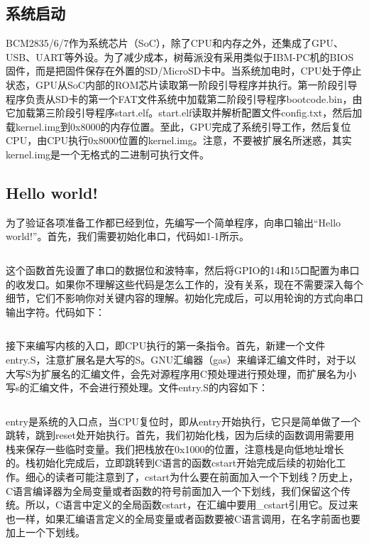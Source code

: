 \documentclass[main.tex]{subfiles}
\begin{document}
\begin{CJK*}{UTF8}{song}

\chapter{系统启动}
BCM2835/6/7作为系统芯片（SoC），除了CPU和内存之外，还集成了GPU、USB、UART等外设。为了减少成本，树莓派没有采用类似于IBM-PC机的BIOS固件，而是把固件保存在外置的SD/MicroSD卡中。当系统加电时，CPU处于停止状态，GPU从SoC内部的ROM芯片读取第一阶段引导程序并执行。第一阶段引导程序负责从SD卡的第一个FAT文件系统中加载第二阶段引导程序bootcode.bin，由它加载第三阶段引导程序start.elf。start.elf读取并解析配置文件config.txt，然后加载kernel.img到0x8000的内存位置。至此，GPU完成了系统引导工作，然后复位CPU，由CPU执行0x8000位置的kernel.img。注意，不要被扩展名所迷惑，其实kernel.img是一个无格式的二进制可执行文件。

\section{Hello world!}
为了验证各项准备工作都已经到位，先编写一个简单程序，向串口输出“Hello world!”。首先，我们需要初始化串口，代码如1-1所示。

\inputminted[firstline=6,lastline=30,linenos,numbersep=5pt,frame=lines,framesep=2mm]{c}{chapter02/kernel/machdep.c}

这个函数首先设置了串口的数据位和波特率，然后将GPIO的14和15口配置为串口的收发口。如果你不理解这些代码是怎么工作的，没有关系，现在不需要深入每个细节，它们不影响你对关键内容的理解。初始化完成后，可以用轮询的方式向串口输出字符。代码如下：

\inputminted[firstline=32,lastline=41,linenos,numbersep=5pt,frame=lines,framesep=2mm]{c}{chapter02/kernel/machdep.c}

\par

接下来编写内核的入口，即CPU执行的第一条指令。首先，新建一个文件entry.S，注意扩展名是大写的S。GNU汇编器（gas）来编译汇编文件时，对于以大写S为扩展名的汇编文件，会先对源程序用C预处理进行预处理，而扩展名为小写s的汇编文件，不会进行预处理。文件entry.S的内容如下：

\inputminted[linenos,numbersep=5pt,frame=lines,framesep=2mm]{gas}{chapter02/kernel/entry.S}

entry是系统的入口点，当CPU复位时，即从entry开始执行，它只是简单做了一个跳转，跳到reset处开始执行。首先，我们初始化栈，因为后续的函数调用需要用栈来保存一些临时变量。我们把栈放在0x1000的位置，注意栈是向低地址增长的。栈初始化完成后，立即跳转到C语言的函数cstart开始完成后续的初始化工作。细心的读者可能注意到了，cstart为什么要在前面加入一个下划线？历史上，C语言编译器为全局变量或者函数的符号前面加入一个下划线，我们保留这个传统。所以，C语言中定义的全局函数cstart，在汇编中要用\_cstart引用它。反过来也一样，如果汇编语言定义的全局变量或者函数要被C语言调用，在名字前面也要加上一个下划线。


\end{CJK*}
\end{document}
